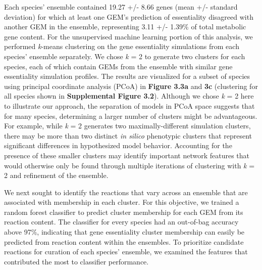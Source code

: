 \documentclass[11pt,twocolumn,notitlepage,openany,twoside]{book}
\begin{document}
\begin{refsection}
Each species’ ensemble contained 19.27 +/- 8.66 genes (mean +/- standard deviation) for which at least one GEM’s prediction of essentiality disagreed with another GEM in the ensemble, representing 3.11 +/- 1.39\% of total metabolic gene content. For the unsupervised machine learning portion of this analysis, we performed \textit{k}-means clustering on the gene essentiality simulations from each species’ ensemble separately. We chose \textit{k} = 2 to generate two clusters for each species, each of which contain GEMs from the ensemble with similar gene essentiality simulation profiles. The results are visualized for a subset of species using principal coordinate analysis (PCoA) in \textbf{Figure 3.3a} and \textbf{3c} (clustering for all species shown in \textbf{Supplemental Figure 3.2}). Although we chose \textit{k} = 2 here to illustrate our approach, the separation of models in PCoA space suggests that for many species, determining a larger number of clusters might be advantageous. For example, while \textit{k} = 2 generates two maximally-different simulation clusters, there may be more than two distinct \textit{in silico} phenotypic clusters that represent significant differences in hypothesized model behavior. Accounting for the presence of these smaller clusters may identify important network features that would otherwise only be found through multiple iterations of clustering with \textit{k} = 2 and refinement of the ensemble.

We next sought to identify the reactions that vary across an ensemble that are associated with membership in each cluster. For this objective, we trained a random forest classifier \cite{Breiman2001-pl} to predict cluster membership for each GEM from its reaction content. The classifier for every species had an out-of-bag accuracy above 97\%, indicating that gene essentiality cluster membership can easily be predicted from reaction content within the ensembles. To prioritize candidate reactions for curation of each species’ ensemble, we examined the features that contributed the most to classifier performance.


\end{refsection}
\end{document}

